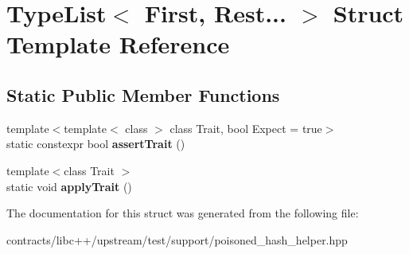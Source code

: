 \hypertarget{struct_type_list_3_01_first_00_01_rest_8_8_8_01_4}{}\section{Type\+List$<$ First, Rest... $>$ Struct Template Reference}
\label{struct_type_list_3_01_first_00_01_rest_8_8_8_01_4}
\subsection*{Static Public Member Functions}
\begin{DoxyCompactItemize}
\item 
\mbox{\label{struct_type_list_3_01_first_00_01_rest_8_8_8_01_4_a8784b2f22df2ca5dbd6468f28f00a5c9}} 
{\footnotesize template$<$template$<$ class $>$ class Trait, bool Expect = true$>$ }\\static constexpr bool {\bfseries assert\+Trait} ()
\item 
\mbox{\label{struct_type_list_3_01_first_00_01_rest_8_8_8_01_4_a2bc45e6d9212256dd585dfa45a6f78cf}} 
{\footnotesize template$<$class Trait $>$ }\\static void {\bfseries apply\+Trait} ()
\end{DoxyCompactItemize}


The documentation for this struct was generated from the following file\+:\begin{DoxyCompactItemize}
\item 
contracts/libc++/upstream/test/support/poisoned\+\_\+hash\+\_\+helper.\+hpp\end{DoxyCompactItemize}
